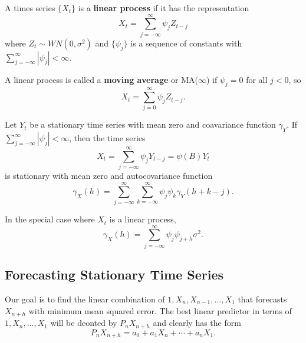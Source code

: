 \begin{defn}
  \label{defn:stationary_processes:1}
  A times series $\{ X_{t} \}$ is a \textbf{linear process} if it has
  the representation
  \begin{equation}
    \label{eq:9}
    X_{t} = \sum_{j=-\infty}^{\infty} \psi_{j} Z_{t-j}
  \end{equation}
  where $Z_{t} \sim WN(0, \sigma^{2})$ and $\{ \psi_{j} \}$ is a
  sequence of constants with $\sum_{j=-\infty}^{\infty} |\psi_{j}| <
  \infty$.
\end{defn}

A linear process is called a \textbf{moving average} or MA($\infty$)
if $\psi_{j} = 0$ for all $j < 0$, so
\begin{equation}
  \label{eq:9}
  X_{t} = \sum_{j=0}^{\infty} \psi_{j} Z_{t-j}.
\end{equation}

\begin{proposition}
  Let $Y_{t}$ be a stationary time series with mean zero and
  coavariance function $\gamma_{Y}$.  If $\sum_{j=-\infty}^{\infty}
  |\psi_{j}| < \infty$, then the time series
  \begin{equation}
    \label{eq:9}
    X_{t} = \sum_{j=-\infty}^{\infty} \psi_{j} Y_{t-j} = \psi(B) Y_{t}
  \end{equation}
  is stationary with mean zero and autocovariance function
  \begin{equation}
    \gamma_{X}(h) = \sum_{j=-\infty}^{\infty}
    \sum_{k=-\infty}^{\infty} \psi_{j}\psi_{k} \gamma_{Y}(h + k - j).
  \end{equation}

  In the special case where $X_{t}$ is a linear process,
  \begin{equation}
    \gamma_{X}(h) = \sum_{j=-\infty}^{\infty} \psi_{j} \psi_{j + h} \sigma^{2}.
  \end{equation}
\end{proposition}

\subsection{Forecasting Stationary Time Series}
\label{sec:forec-stat-time}

Our goal is to find the linear combination of $1, X_{n}, X_{n-1},
\dots, X_{1}$ that forecasts $X_{n+h}$ with minimum mean squared
error.  The best linear predictor in terms of $1, X_{n}, \dots, X_{1}$
will be deonted by $P_{n} X_{n+h}$ and clearly has the form
\begin{equation}
  P_{n}X_{n+h} = a_{0} + a_{1} X_{n} + \cdots + a_{n} X_{1}.
\end{equation}

